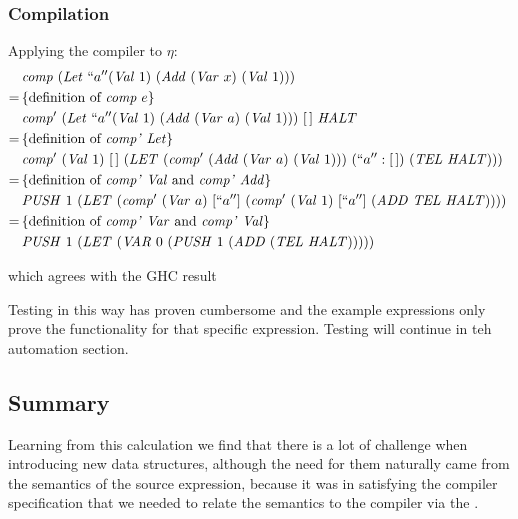 \documentclass {article}
\begin{document}
\subsubsection{Compilation}

Applying the compiler to $\eta$:
\begin{align*}
&\Comp (\Let ``a'' (\Val 1)\ (\Add (\Var x)\ (\Val 1))) \\
=\, & \{ \mbox{definition of \comp\ $e$} \}\ \\ 
&\Compp  (\Let ``a'' (\Val 1)\ 
			(\Add (\Var a)\ (\Val 1)))\ [\, ]\ \HALT \\
=\, & \{ \mbox{definition of \compp\ \leet} \}\ \\
&\Compp  (\Val 1)\ [\, ]\ (\LET 
	(\Compp (\Add (\Var a)\ (\Val 1)))\ 
		(``a'':[\, ])\ (\TEL \HALT)))\ \\
=\, & \{ \mbox{definition of \compp\ \val\ and \compp\ \add} \}\ \\
&\PUSH 1\ (\LET 
	(\Compp (\Var a)\ [``a'']\ (\Compp (\Val 1)\ [``a'']\  
		(\ADD \TEL \HALT))))\ \\ 
=\, & \{ \mbox{definition of \compp\ \var\ and \compp\ \val} \}\ \\
&\PUSH 1\ (\LET 
	(\VAR 0\ (\PUSH 1\ 
		(\ADD (\TEL \HALT)))))\ \\ 
\end{align*}

which agrees with the GHC result

Testing in this way has proven cumbersome and 
 the example expressions only prove the functionality for that 
 specific expression. Testing will continue in teh automation section.


\subsection{Summary}

Learning from this calculation we find that there is a lot of challenge
when introducing new data structures,
although the need for them naturally came from the semantics of the 
source expression, because it was in satisfying 
the compiler specification that we needed to relate the semantics
to the compiler via the \vm.
\end{document}
